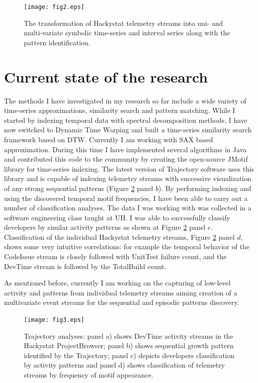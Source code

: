 \documentclass[11pt,oneside]{article}
\begin{document}
\begin{figure}[tbp]
   \centering
   \texttt{[image: fig2.eps]}
   \caption{The transformation of Hackystat telemetry streams into uni- and multi-variate symbolic time-series and interval series along with the pattern identification.}
   \label{fig:fig2}
\end{figure}

\section{Current state of the research}
The methods I have investigated in my research so far include a wide variety of time-series approximations, similarity search and pattern matching. While I started by indexing temporal data with spectral decomposition methods, I have now switched to Dynamic Time Warping and built a time-series similarity search framework based on DTW. Currently I am working with SAX based approximation. During this time I have implemented several algorithms in Java and contributed this code to the community by creating the open-source JMotif library for time-series indexing. The latest version of Trajectory software uses this library and is capable of indexing telemetry streams with successive visualization of any strong sequential patterns (Figure \ref{fig:fig3} panel $b$). By performing indexing and using the discovered temporal motif frequencies, I have been able to carry out a number of classification analyses. The data I was working with was collected in a software engineering class taught at UH. I was able to successfully classify developers by similar activity patterns as shown at Figure \ref{fig:fig3} panel $c$. Classification of the individual Hackystat telemetry streams, Figure \ref{fig:fig3} panel $d$, shows some very intuitive correlations: for example the temporal behavior of the CodeIssue stream is closely followed with UnitTest failure count, and the DevTime stream is followed by the TotalBuild count.

As mentioned before, currently I am working on the capturing of low-level activity and patterns from individual telemetry streams aiming creation of a multivariate event streams for the sequential and episodic patterns discovery.

\begin{figure}[tbp]
   \centering
   \texttt{[image: fig3.eps]}
   \caption{Trajectory analyses: panel a) shows DevTime activity streams in the Hackystat ProjectBrowser; panel b) shows sequential growth pattern identified by the Trajectory; panel c) depicts developers classification by activity patterns and panel d) shows classification of telemetry streams by frequency of motif appearance.}
   \label{fig:fig3}
\end{figure}
\end{document}
